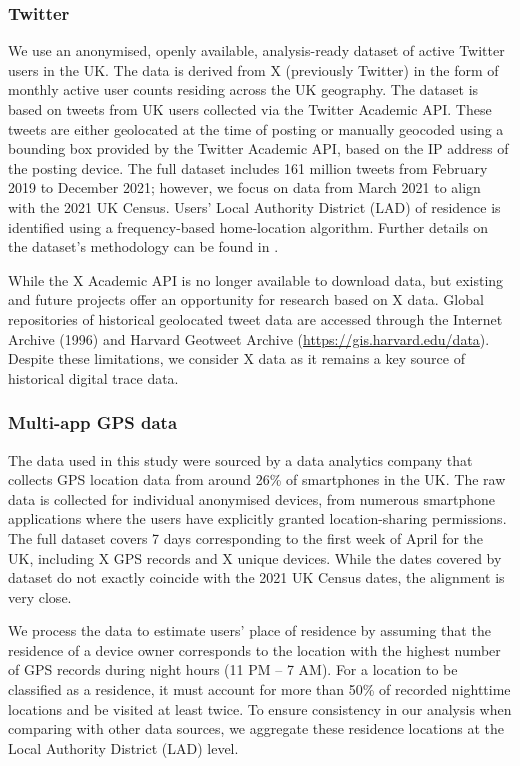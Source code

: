 \documentclass[]{rsos}%
\begin{document}
\hypertarget{twitter}{%
\subsubsection{Twitter}\label{twitter}}

We use an anonymised, openly available, analysis-ready dataset of active
Twitter users in the UK. The data is derived from X (previously Twitter)
in the form of monthly active user counts residing across the UK
geography. The dataset is based on tweets from UK users \citep{wang2022}
collected via the Twitter Academic API. These tweets are either
geolocated at the time of posting or manually geocoded using a bounding
box provided by the Twitter Academic API, based on the IP address of the
posting device. The full dataset includes 161 million tweets from
February 2019 to December 2021; however, we focus on data from March
2021 to align with the 2021 UK Census. Users' Local Authority District
(LAD) of residence is identified using a frequency-based home-location
algorithm. Further details on the dataset's methodology can be found in
\citep{wang2022} .

While the X Academic API is no longer available to download data, but
existing and future projects offer an opportunity for research based on
X data. Global repositories of historical geolocated tweet data are
accessed through the Internet Archive (1996) and Harvard Geotweet
Archive (\url{https://gis.harvard.edu/data}). Despite these limitations, we
consider X data as it remains a key source of historical digital trace
data.

\hypertarget{multi-app-gps-data}{%
\subsubsection{Multi-app GPS data}\label{multi-app-gps-data}}

The data used in this study were sourced by a data analytics company
that collects GPS location data from around 26\% of smartphones in the
UK. The raw data is collected for individual anonymised devices, from
numerous smartphone applications where the users have explicitly granted
location-sharing permissions. The full dataset covers 7 days
corresponding to the first week of April for the UK, including X GPS
records and X unique devices. While the dates covered by dataset do not
exactly coincide with the 2021 UK Census dates, the alignment is very
close.

We process the data to estimate users' place of residence by assuming
that the residence of a device owner corresponds to the location with
the highest number of GPS records during night hours (11 PM -- 7 AM). For
a location to be classified as a residence, it must account for more
than 50\% of recorded nighttime locations and be visited at least twice.
To ensure consistency in our analysis when comparing with other data
sources, we aggregate these residence locations at the Local Authority
District (LAD) level.
\end{document}
